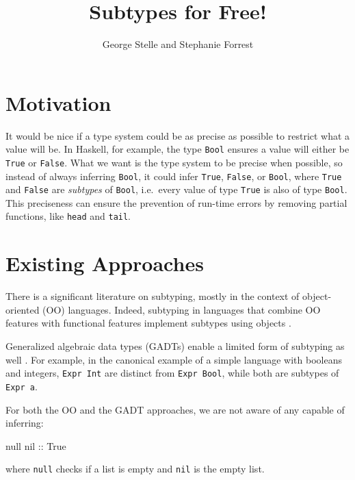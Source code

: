\documentclass[]{article}
\title{Subtypes for Free!}
\author{George Stelle and Stephanie Forrest}
\date{}
\newenvironment{Shaded}{}{}
\newcommand{\DataTypeTok}[1]{\textcolor[rgb]{0.56,0.13,0.00}{{#1}}}
\newcommand{\OtherTok}[1]{\textcolor[rgb]{0.00,0.44,0.13}{{#1}}}
\newcommand{\NormalTok}[1]{{#1}}
\begin{document}
\maketitle

\section{Motivation}\label{motivation}

It would be nice if a type system could be as precise as possible to
restrict what a value will be. In Haskell, for example, the type
\texttt{Bool} ensures a value will either be \texttt{True} or
\texttt{False}. What we want is the type system to be precise when
possible, so instead of always inferring \texttt{Bool}, it could infer
\texttt{True}, \texttt{False}, or \texttt{Bool}, where \texttt{True} and
\texttt{False} are \emph{subtypes} of \texttt{Bool}, i.e.~every value of
type \texttt{True} is also of type \texttt{Bool}. This preciseness can
ensure the prevention of run-time errors by removing partial functions,
like \texttt{head} and \texttt{tail}.

\section{Existing Approaches}\label{existing-approaches}

There is a significant literature on subtyping, mostly in the context of
object-oriented (OO) languages. Indeed, subtyping in languages that
combine OO features with functional features implement subtypes using
objects \cite{odersky2004overview, leroy2014ocaml}.

Generalized algebraic data types (GADTs) enable a limited form of
subtyping as well \cite{fluet2006phantom}. For example, in the canonical
example of a simple language with booleans and integers,
\texttt{Expr Int} are distinct from \texttt{Expr Bool}, while both are
subtypes of \texttt{Expr a}.

For both the OO and the GADT approaches, we are not aware of any capable
of inferring:

\begin{Shaded}
\begin{Highlighting}[]
   \NormalTok{null}\OtherTok{ nil ::} \DataTypeTok{True}
\end{Highlighting}
\end{Shaded}

where \texttt{null} checks if a list is empty and \texttt{nil} is the
empty list.
\end{document}
